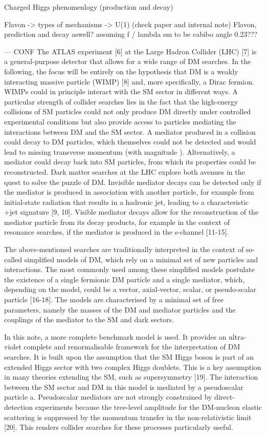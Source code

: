 Charged Higgs phenomenlogy (production and decay)

Flavon -> types of mechanisms -> U(1) (check paper and internal note)
Flavon, prediction and decay aswell?
assuming f / lambda sm to be cabibo angle 0.23???


---
CONF %
The ATLAS experiment [6] at the Large Hadron Collider (LHC) [7] is a general-purpose detector that allows
for a wide range of DM searches. In the following, the focus will be entirely on the hypothesis that DM is a
weakly interacting massive particle (WIMP) [8] and, more specifically, a Dirac fermion. WIMPs could in
principle interact with the SM sector in different ways. A particular strength of collider searches lies in the
fact that the high-energy collisions of SM particles could not only produce DM directly under controlled
experimental conditions but also provide access to particles mediating the interactions between DM and
the SM sector. A mediator produced in a collision could decay to DM particles, which themselves could
not be detected and would lead to missing transverse momentum (with magnitude \MET). Alternatively, a
mediator could decay back into SM particles, from which its properties could be reconstructed.
Dark matter searches at the LHC explore both avenues in the quest to solve the puzzle of DM. Invisible
mediator decays can be detected only if the mediator is produced in association with another particle,
for example from initial-state radiation that results in a hadronic jet, leading to a characteristic \MET+jet
signature [9, 10]. Visible mediator decays allow for the reconstruction of the mediator particle from
its decay products, for example in the context of resonance searches, if the mediator is produced in the
s-channel [11-15].

The above-mentioned searches are traditionally interpreted in the context of so-called simplified models of
DM, which rely on a minimal set of new particles and interactions. The most commonly used among these
simplified models postulate the existence of a single fermionic DM particle and a single mediator, which,
depending on the model, could be a vector, axial-vector, scalar, or pseudo-scalar particle [16-18]. The
models are characterised by a minimal set of free parameters, namely the masses of the DM and mediator
particles and the couplings of the mediator to the SM and dark sectors.

In this note, a more complete benchmark model is used. It provides an ultra-violet complete and
renormalisable framework for the interpretation of DM searches. It is built upon the assumption that the
SM Higgs boson is part of an extended Higgs sector with two complex Higgs doublets. This is a key
assumption in many theories extending the SM, such as supersymmetry [19]. The interaction between the
SM sector and DM in this model is mediated by a pseudoscalar particle a. Pseudoscalar mediators are not
strongly constrained by direct-detection experiments because the tree-level amplitude for the DM-nucleon
elastic scattering is suppressed by the momentum transfer in the non-relativistic limit [20]. This renders
collider searches for these processes particularly useful.

